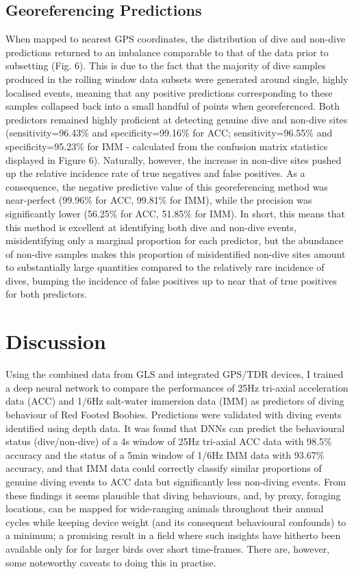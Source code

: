\documentclass[11pt]{article}
\begin{document}
    \subsection{Georeferencing Predictions}
    When mapped to nearest GPS coordinates, the distribution of dive and non-dive predictions returned to an imbalance comparable to that of the data prior to subsetting (Fig. 6). This is due to the fact that the majority of dive samples produced in the rolling window data subsets were generated around single, highly localised events, meaning that any positive predictions corresponding to these samples collapsed back into a small handful of points when georeferenced. Both predictors remained highly proficient at detecting genuine dive and non-dive sites (sensitivity=96.43\% and specificity=99.16\% for ACC; sensitivity=96.55\% and specificity=95.23\% for IMM - calculated from the confusion matrix statistics displayed in Figure 6). Naturally, however, the increase in non-dive sites pushed up the relative incidence rate of true negatives and false positives. As a consequence, the negative predictive value of this georeferencing method was near-perfect (99.96\% for ACC, 99.81\% for IMM), while the precision was significantly lower (56.25\% for ACC, 51.85\% for IMM). In short, this means that this method is excellent at identifying both dive and non-dive events, misidentifying only a marginal proportion for each predictor, but the abundance of non-dive samples makes this proportion of misidentified non-dive sites amount to substantially large quantities compared to the relatively rare incidence of dives, bumping the incidence of false positives up to near that of true positives for both predictors. 
    
    
    \section{Discussion}
    Using the combined data from GLS and integrated GPS/TDR devices, I trained a deep neural network to compare the performances of 25Hz tri-axial acceleration data (ACC) and 1/6Hz salt-water immersion data (IMM) as predictors of diving behaviour of Red Footed Boobies. Predictions were validated with diving events identified using depth data. It was found that DNNs can predict the behavioural status (dive/non-dive) of a 4s window of 25Hz tri-axial ACC data with 98.5\% accuracy and the status of a 5min window of 1/6Hz IMM data with 93.67\% accuracy, and that IMM data could correctly classify similar proportions of genuine diving events to ACC data but significantly less non-diving events. From these findings it seems plausible that diving behaviours, and, by proxy, foraging locations, can be mapped for wide-ranging animals throughout their annual cycles while keeping device weight (and its consequent behavioural confounds) to a minimum; a promising result in a field where such insights have hitherto been available only for for larger birds over short time-frames. There are, however, some noteworthy caveats to doing this in practise.
    
\end{document}
